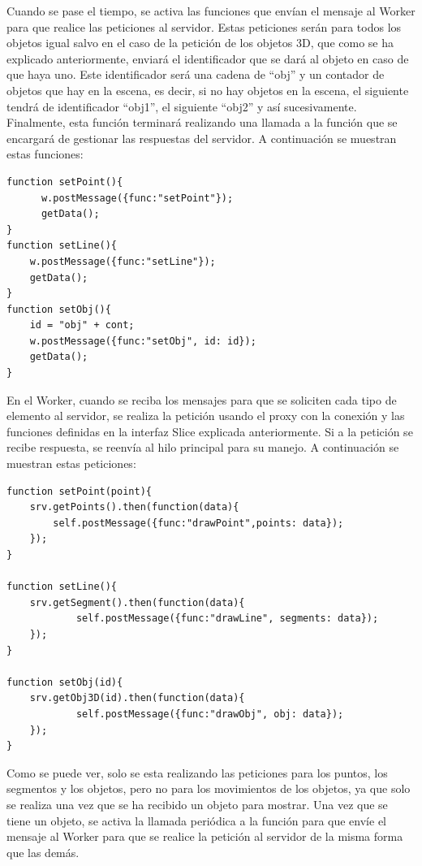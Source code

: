 Cuando se pase el tiempo, se activa las funciones que envían el mensaje al Worker para que realice las peticiones al servidor. Estas peticiones serán para todos los objetos igual salvo en el caso de la petición de los objetos 3D, que como se ha explicado anteriormente, enviará el identificador que se dará al objeto en caso de que haya uno. Este identificador será una cadena de ``obj'' y un contador de objetos que hay en la escena, es decir, si no hay objetos en la escena, el siguiente tendrá de identificador ``obj1'', el siguiente ``obj2'' y así sucesivamente. Finalmente, esta función terminará realizando una llamada a la función que se encargará de gestionar las respuestas del servidor. A continuación se muestran estas funciones:

\begin{lstlisting}[frame=single]
function setPoint(){
      w.postMessage({func:"setPoint"});
      getData();
}
function setLine(){
	w.postMessage({func:"setLine"});
	getData();
}
function setObj(){
	id = "obj" + cont;
	w.postMessage({func:"setObj", id: id});
	getData();
}
\end{lstlisting}

En el Worker, cuando se reciba los mensajes para que se soliciten cada tipo de elemento al servidor, se realiza la petición usando el proxy con la conexión y las funciones definidas en la interfaz Slice explicada anteriormente. Si a la petición se recibe respuesta, se reenvía al hilo principal para su manejo. A continuación se muestran estas peticiones:

\begin{lstlisting}[frame=single]
function setPoint(point){
 	srv.getPoints().then(function(data){
		self.postMessage({func:"drawPoint",points: data});
	});
}

function setLine(){
	srv.getSegment().then(function(data){
      		self.postMessage({func:"drawLine", segments: data});
  	});
}

function setObj(id){
  	srv.getObj3D(id).then(function(data){
    		self.postMessage({func:"drawObj", obj: data});
  	});
}
\end{lstlisting}

Como se puede ver, solo se esta realizando las peticiones para los puntos, los segmentos y los objetos, pero no para los movimientos de los objetos, ya que solo se realiza una vez que se ha recibido un objeto para mostrar. Una vez que se tiene un objeto, se activa la llamada periódica a la función para que envíe el mensaje al Worker para que se realice la petición al servidor de la misma forma que las demás.

